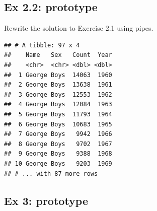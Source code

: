 \documentclass[
]{book}
\newenvironment{Shaded}{\begin{snugshade}}{\end{snugshade}}
\newcommand{\KeywordTok}[1]{\textcolor[rgb]{0.13,0.29,0.53}{\textbf{#1}}}
\newcommand{\NormalTok}[1]{#1}
\newcommand{\OperatorTok}[1]{\textcolor[rgb]{0.81,0.36,0.00}{\textbf{#1}}}
\newcommand{\StringTok}[1]{\textcolor[rgb]{0.31,0.60,0.02}{#1}}
\begin{document}
\hypertarget{ex-2.2-prototype}{%
\subsection{Ex 2.2: prototype}\label{ex-2.2-prototype}}

Rewrite the solution to Exercise 2.1 using pipes.

\begin{Shaded}
\end{Shaded}

\begin{verbatim}
## # A tibble: 97 x 4
##    Name   Sex   Count  Year
##    <chr>  <chr> <dbl> <dbl>
##  1 George Boys  14063  1960
##  2 George Boys  13638  1961
##  3 George Boys  12553  1962
##  4 George Boys  12084  1963
##  5 George Boys  11793  1964
##  6 George Boys  10683  1965
##  7 George Boys   9942  1966
##  8 George Boys   9702  1967
##  9 George Boys   9388  1968
## 10 George Boys   9203  1969
## # ... with 87 more rows
\end{verbatim}

\hypertarget{ex-3-prototype}{%
\subsection{Ex 3: prototype}\label{ex-3-prototype}}
\end{document}

